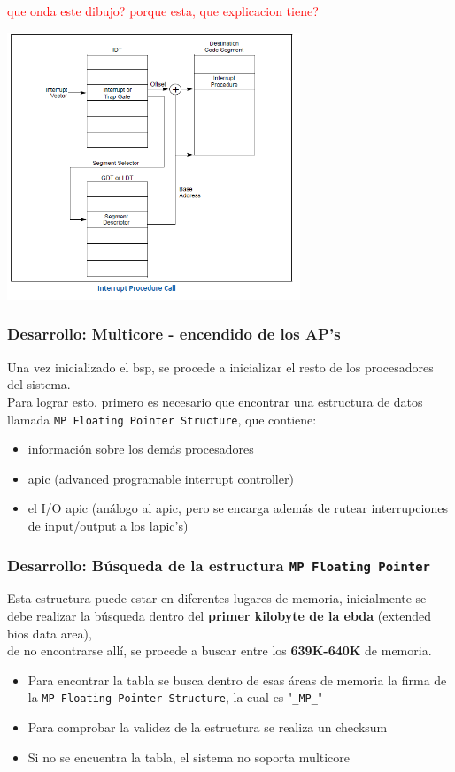\documentclass{beamer}
\begin{document}
\begin{frame}
\huge \textcolor{red}{que onda este dibujo? porque esta, que explicacion tiene?}
  \begin{center}
  \includegraphics[height=8cm]{images/interrupts.png}
  \end{center}
\end{frame}

\begin{frame}
\frametitle{Desarrollo: Multicore - encendido de los AP's}
Una vez inicializado el bsp, se procede a inicializar el resto de los procesadores del sistema.\\
\vspace{20pt}
Para lograr esto, primero es necesario que encontrar una estructura de datos llamada \texttt{MP Floating Pointer Structure}, que contiene:

\begin{itemize} \scriptsize
 \item información sobre los demás procesadores
 \item apic (advanced programable interrupt controller)
 \item el I/O apic (análogo al apic, pero se encarga además de rutear interrupciones de input/output a los lapic's)
\end{itemize}
\end{frame}

\begin{frame}
  \frametitle{Desarrollo: \small Búsqueda de la estructura \texttt{MP Floating Pointer}}
  Esta estructura puede estar en diferentes lugares de memoria, inicialmente se debe realizar la búsqueda dentro del \textbf{primer kilobyte de la ebda} (extended bios data area), \\
  de no encontrarse allí, se procede a buscar entre los \textbf{639K-640K} de memoria.\\
  \vspace{20pt}
  \begin{itemize}
   \item Para encontrar la tabla se busca dentro de esas áreas de memoria la firma de la \texttt{MP Floating Pointer Structure}, la cual es "\texttt{\_MP\_}"
  \item Para comprobar la validez de la estructura se realiza un checksum
  \item Si no se encuentra la tabla, el sistema no soporta multicore
  \end{itemize}
\end{frame}
\end{document}
